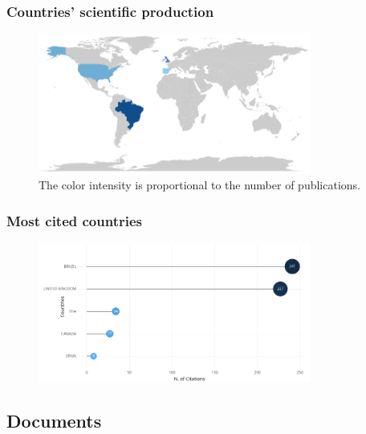 \documentclass[aspectratio=169]{beamer}
\begin{document}

\begin{frame}
  \frametitle{Countries' scientific production}
  \begin{figure}
    \centering
    \includegraphics[width=0.8\textwidth]
    {img/countries_scientific_production.png}
    \caption{The color intensity is proportional to the number of publications.}
    \label{fig:countries_scientific_production}
  \end{figure}
\end{frame}

\begin{frame}
  \frametitle{Most cited countries}
  \begin{figure}
    \centering
    \includegraphics[width=0.8\textwidth]
    {img/most_cited_countries.png}
    \label{fig:most_cited_countries}
  \end{figure}
\end{frame}



\subsection{Documents}
\end{document}
